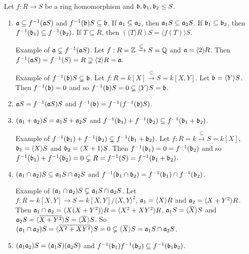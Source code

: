 \begin{proposition}
    Let $f: R \to S$ be a ring homomorphism and $\mathfrak{b},\mathfrak{b}_1,\mathfrak{b}_2 \leq S$.
    \begin{enumerate}
        \item $\mathfrak{a} \subseteq f^{-1}(\mathfrak{a} S)$ and $f^{-1}(\mathfrak{b})S \subseteq \mathfrak{b}$. If $\mathfrak{a}_1 \subseteq \mathfrak{a}_2$, then $\mathfrak{a}_1S \subseteq \mathfrak{a}_2S$. If $\mathfrak{b}_1 \subseteq \mathfrak{b}_2$, then $f^{-1}(\mathfrak{b}_1) \subseteq f^{-1}(\mathfrak{b}_2)$. If $T \subseteq R$, then $(\langle T \rangle R) S = \langle f(T) \rangle S$. \par
            Example of $\mathfrak{a} \subsetneq f^{-1}(\mathfrak{a} S)$. Let $f: R = \mathbb{Z} \xrightarrow {\subseteq} S = \mathbb{Q}$ and $\mathfrak{a} = \langle 2 \rangle R$. Then $f^{-1}(\mathfrak{a} S) = f^{-1}(S) = R \supsetneq \langle 2 \rangle R = \mathfrak{a}$. \par 
            Example of $f^{-1}(\mathfrak{b})S \subsetneq \mathfrak{b}$. Let $f: R = k[X] \xrightarrow {\subseteq } S = k[X,Y]$. Let $\mathfrak{b} = \langle Y \rangle S$. Then $f^{-1}(\mathfrak{b}) = 0$ and so $f^{-1}(\mathfrak{b})S = 0 \subsetneq \langle Y \rangle S = \mathfrak{b}$.
        \item $\mathfrak{a} S = f^{-1}(\mathfrak{a} S)S$ and $f^{-1}(\mathfrak{b}) = f^{-1}(f^{-1}(\mathfrak{b})S)$.
        \item $(\mathfrak{a}_1 + \mathfrak{a}_2)S = \mathfrak{a}_1S + \mathfrak{a}_2S$ and $f^{-1}(\mathfrak{b}_1) + f^{-1}(\mathfrak{b}_2) \subseteq f^{-1}(\mathfrak{b}_1 + \mathfrak{b}_2)$. \par 
            Example of $f^{-1}(\mathfrak{b}_1) + f^{-1}(\mathfrak{b}_2) \subsetneq f^{-1}(\mathfrak{b}_1+\mathfrak{b}_2)$. Let $f: R = k \xrightarrow \subseteq S = k[X]$, $\mathfrak{b}_1 = \langle X \rangle S$ and $\mathfrak{b}_2 = \langle X+1 \rangle S$. Then $f^{-1}(\mathfrak{b}_1) = 0 = f^{-1}(\mathfrak{b}_2)$ and so $f^{-1}(\mathfrak{b}_1) + f^{-1}(\mathfrak{b}_2) = 0 \subsetneq R = f^{-1}(S) = f^{-1}(\mathfrak{b}_1 + \mathfrak{b}_2)$.
        \item $(\mathfrak{a}_1 \cap \mathfrak{a}_2)S \subseteq \mathfrak{a}_1S \cap \mathfrak{a}_2S$ and $f^{-1}(\mathfrak{b}_1 \cap \mathfrak{b}_2) = f^{-1}(\mathfrak{b}_1) \cap f^{-1}(\mathfrak{b}_2)$. \par
            Example of $(\mathfrak{a}_1 \cap \mathfrak{a}_2)S \subsetneq \mathfrak{a}_1S \cap \mathfrak{a}_2S$. Let $f: R = k[X,Y] \to S = k[X,Y]/\langle X,Y \rangle^2$, $\mathfrak{a}_1 = \langle X \rangle R$ and $\mathfrak{a}_2 = \langle X+Y^2 \rangle R$. Then $\mathfrak{a}_1 \cap \mathfrak{a}_2 = \langle X(X+Y^2) \rangle R = \langle X^2 + XY^2 \rangle R$, $\ffa_1 S = \langle \overbar X \rangle S$ and $\ffa_2 S = \langle \overbar{X+Y^2} \rangle S = \langle \overbar X \rangle S$. So $(\ffa_1 \cap \ffa_2)S = \langle \overbar{X^2+XY^2} \rangle S = 0 \subsetneq \langle \overbar X \rangle S = \ffa_1 S \cap \ffa_2 S$.
        \item $(\mathfrak{a}_1\mathfrak{a}_2)S = (\mathfrak{a}_1S)(\mathfrak{a}_2S)$ and $f^{-1}(\mathfrak{b}_1)f^{-1}(\mathfrak{b}_2) \subseteq f^{-1}(\mathfrak{b}_1\mathfrak{b}_2)$. \par

\end{enumerate}
\end{proposition}
